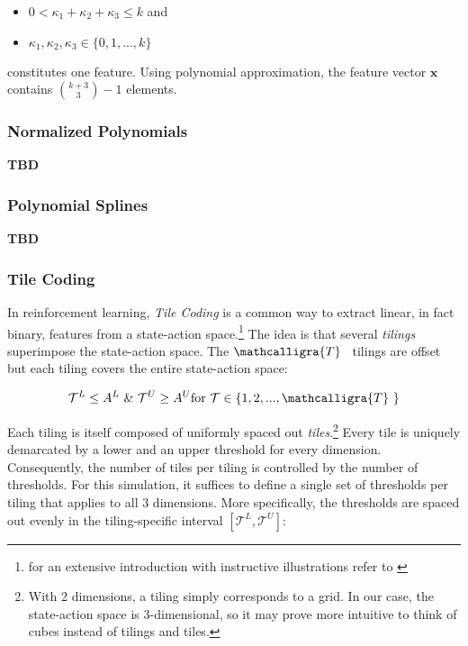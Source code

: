 \begin{itemize}
	\item $0 < \kappa_1 + \kappa_2 + \kappa_3 \leq k$ and
	\item $\kappa_1, \kappa_2, \kappa_3 \in \{0, 1, ..., k\}$
\end{itemize}

constitutes one feature. Using polynomial approximation, the feature vector $\boldsymbol{x}$ contains ${k + 3\choose3}  - 1$ elements.

\subsubsection{Normalized Polynomials}

\textbf{TBD}

\subsubsection{Polynomial Splines}

\textbf{TBD}

\subsubsection{Tile Coding}

In reinforcement learning, \emph{Tile Coding} is a common way to extract linear, in fact binary, features from a state-action space.\footnote{for an extensive introduction with instructive illustrations refer to \textcite{sutton_reinforcement_2018}} The idea is that several \emph{tilings} superimpose the state-action space. The $\mathcalligra{T}$ \ tilings are offset but each tiling covers the entire state-action space:

\begin{gather}
	 \mathcal{T}^L \leq A^L  ~ \& ~ \mathcal{T}^U \geq A^U    \text{for } \mathcal{T} \in \{1, 2, ..., \mathcalligra{T} ~ \}
\end{gather}

Each tiling is itself composed of uniformly spaced out \emph{tiles}.\footnote{With 2 dimensions, a tiling simply corresponds to a grid. In our case, the state-action space is 3-dimensional, so it may prove more intuitive to think of cubes instead of tilings and tiles.} Every tile is uniquely demarcated by a lower and an upper threshold for every dimension. Consequently, the number of tiles per tiling is controlled by the number of thresholds. For this simulation, it suffices to define a single set of thresholds per tiling that applies to all 3 dimensions. More specifically, the thresholds are spaced out evenly in the tiling-specific interval $[\mathcal{T}^L, \mathcal{T}^U]$:

